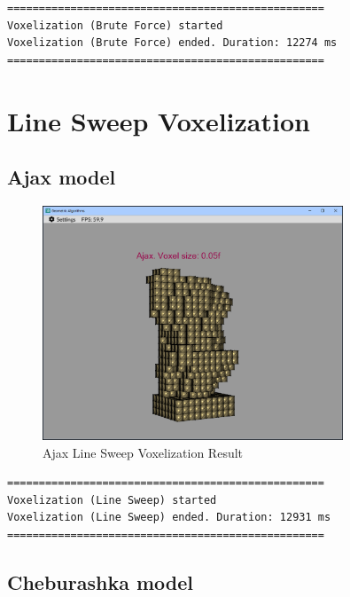 \documentclass[12pt,a4paper,english]{article}
\begin{document}
\begin{verbatim}
==================================================
Voxelization (Brute Force) started
Voxelization (Brute Force) ended. Duration: 12274 ms
==================================================
\end{verbatim}

\section{Line Sweep Voxelization}

\subsection{Ajax model}

\begin{figure}[H]
    \centering
    \includegraphics[width=0.8\textwidth]{p3-2-ajax-line-sweep}
    \caption[]{Ajax Line Sweep Voxelization Result}
    \label{fig:p3-2-ajax-line-sweep}
\end{figure}

\begin{verbatim}
==================================================
Voxelization (Line Sweep) started
Voxelization (Line Sweep) ended. Duration: 12931 ms
==================================================
\end{verbatim}

\subsection{Cheburashka model}
\end{document}
